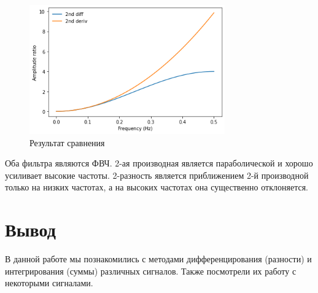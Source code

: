 \documentclass[a4paper, 12pt]{report}
\begin{document}
	\begin{figure}[H]
		\centering
		\includegraphics[width=0.75\textwidth]{task16.png}
		\caption{Результат сравнения}
		\label{fig:task16}
	\end{figure}
	Оба фильтра являются ФВЧ. 2-ая производная является параболической и хорошо усиливает высокие частоты. 2-разность является приближением 2-й производной только на низких частотах, а на высоких частотах она существенно отклоняется.

	\chapter{Вывод}
	В данной работе мы познакомились с методами дифференцирования (разности) и интегрирования (суммы) различных сигналов. Также посмотрели их работу с некоторыми сигналами.
\end{document}
